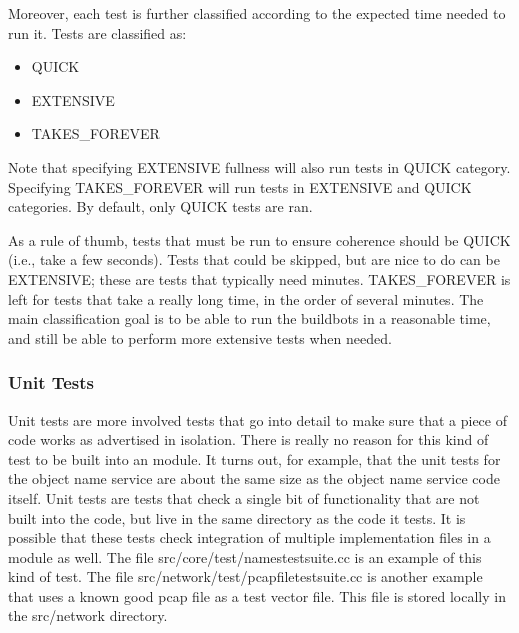 \documentclass[letterpaper,10pt,english]{sphinxmanual}
\begin{document}
Moreover, each test is further classified according to the expected time needed to
run it. Tests are classified as:
\begin{itemize}
\item {} 
QUICK

\item {} 
EXTENSIVE

\item {} 
TAKES\_FOREVER

\end{itemize}

Note that specifying EXTENSIVE fullness will also run tests in QUICK category.
Specifying TAKES\_FOREVER will run tests in EXTENSIVE and QUICK categories.
By default, only QUICK tests are ran.

As a rule of thumb, tests that must be run to ensure  coherence should be
QUICK (i.e., take a few seconds). Tests that could be skipped, but are nice to do
can be EXTENSIVE; these are tests that typically need minutes. TAKES\_FOREVER is
left for tests that take a really long time, in the order of several minutes.
The main classification goal is to be able to run the buildbots in a reasonable
time, and still be able to perform more extensive tests when needed.


\subsubsection{Unit Tests}
\label{\detokenize{test-framework:unit-tests}}
Unit tests are more involved tests that go into detail to make sure that a
piece of code works as advertised in isolation.  There is really no reason
for this kind of test to be built into an  module.  It turns out, for
example, that the unit tests for the object name service are about the same
size as the object name service code itself.  Unit tests are tests that
check a single bit of functionality that are not built into the  code,
but live in the same directory as the code it tests.  It is possible that
these tests check integration of multiple implementation files in a module
as well.  The file src/core/test/names\sphinxhyphen{}test\sphinxhyphen{}suite.cc is an example of this kind
of test.  The file src/network/test/pcap\sphinxhyphen{}file\sphinxhyphen{}test\sphinxhyphen{}suite.cc is another example
that uses a known good pcap file as a test vector file.  This file is stored
locally in the src/network directory.
\end{document}
